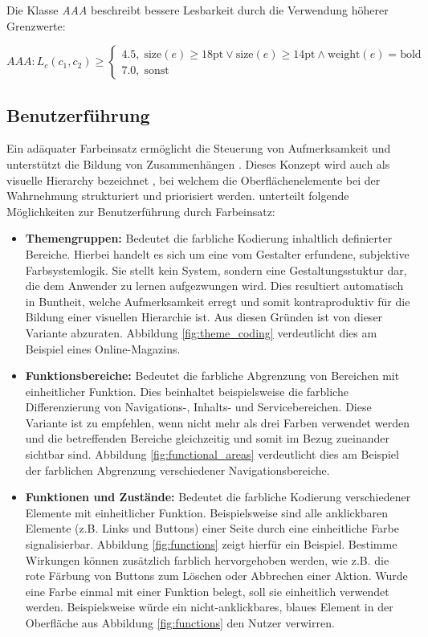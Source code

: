 Die Klasse \emph{AAA} beschreibt bessere Lesbarkeit durch die Verwendung höherer Grenzwerte:

\begin{equation}
  	AAA: L_c(c_1, c_2) \geq
	\begin{cases}
		4.5, \; \text{size}(e) \geq 18\text{pt} \lor \text{size}(e) \geq 14\text{pt} \land \text{weight}(e) = \text{bold}\\
		7.0,  \;  \text{sonst}
	\end{cases}
\end{equation}

\subsection{Benutzerführung}
\label{sec:usability}
Ein adäquater Farbeinsatz ermöglicht die Steuerung von Aufmerksamkeit und unterstützt die Bildung von Zusammenhängen \citep{webdesign}.  Dieses Konzept wird auch als visuelle Hierarchy bezeichnet \citep{visual-hierarchy}, bei welchem die Oberflächenelemente bei der Wahrnehmung strukturiert und priorisiert werden.
\citet{webdesign} unterteilt folgende Möglichkeiten zur Benutzerführung durch Farbeinsatz:

\begin{itemize}
	\item \textbf{Themengruppen:} Bedeutet die farbliche Kodierung inhaltlich definierter Bereiche. Hierbei handelt es sich um eine vom Gestalter erfundene, subjektive Farbsystemlogik. Sie stellt kein System, sondern eine Gestaltungsstuktur dar, die dem Anwender zu lernen aufgezwungen wird. Dies resultiert automatisch in Buntheit, welche Aufmerksamkeit erregt und somit kontraproduktiv für die Bildung einer visuellen Hierarchie ist. Aus diesen Gründen ist von dieser Variante abzuraten. Abbildung \ref{fig:theme_coding} verdeutlicht dies am Beispiel eines Online-Magazins.
	\item \textbf{Funktionsbereiche:} Bedeutet die farbliche Abgrenzung von Bereichen mit einheitlicher Funktion. Dies beinhaltet beispielsweise die farbliche Differenzierung von Navigations-, Inhalts- und Servicebereichen. Diese Variante ist zu empfehlen, wenn nicht mehr als drei Farben verwendet werden und die betreffenden Bereiche gleichzeitig und somit im Bezug zueinander sichtbar sind. Abbildung \ref{fig:functional_areas} verdeutlicht dies am Beispiel der farblichen Abgrenzung verschiedener Navigationsbereiche.
	\item \textbf{Funktionen und Zustände:} Bedeutet die farbliche Kodierung verschiedener Elemente mit einheitlicher Funktion. Beispielsweise sind alle anklickbaren Elemente (z.B. Links und Buttons) einer Seite durch eine einheitliche Farbe signalisierbar. Abbildung \ref{fig:functions} zeigt hierfür ein Beispiel. Bestimme Wirkungen können zusätzlich farblich hervorgehoben werden, wie z.B. die rote Färbung von Buttons zum Löschen oder Abbrechen einer Aktion. Wurde eine Farbe einmal mit einer Funktion belegt, soll sie einheitlich verwendet werden. Beispielsweise würde ein nicht-anklickbares, blaues Element in der Oberfläche aus Abbildung \ref{fig:functions} den Nutzer verwirren.
\end{itemize}

